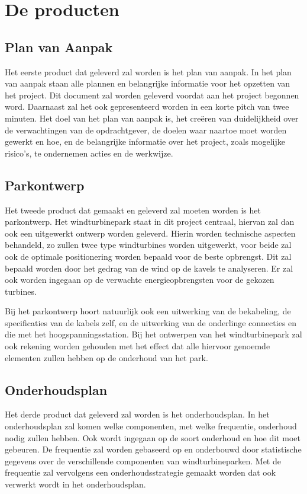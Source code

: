 \section{De producten}
\subsection{Plan van Aanpak}
Het eerste product dat geleverd zal worden is het plan van aanpak. In het plan van aanpak staan alle plannen en belangrijke informatie voor het opzetten van het project. Dit document zal worden geleverd voordat aan het project begonnen word. Daarnaast zal het ook gepresenteerd worden in een korte pitch van twee minuten. Het doel van het plan van aanpak is, het creëren van duidelijkheid over de verwachtingen van de opdrachtgever, de doelen waar naartoe moet worden gewerkt en hoe, en de belangrijke informatie over het project, zoals mogelijke risico's, te ondernemen acties en de werkwijze. 

\subsection{Parkontwerp}
Het tweede product dat gemaakt en geleverd zal moeten worden is het parkontwerp. Het windturbinepark staat in dit project centraal, hiervan zal dan ook een uitgewerkt ontwerp worden geleverd. Hierin worden technische aspecten behandeld, zo zullen twee type windturbines worden uitgewerkt, voor beide zal ook de optimale positionering worden bepaald voor de beste opbrengst. Dit zal bepaald worden door het gedrag van de wind op de kavels te analyseren. Er zal ook worden ingegaan op de verwachte energieopbrengsten voor de gekozen turbines. 

Bij het parkontwerp hoort natuurlijk ook een uitwerking van de bekabeling, de specificaties van de kabels zelf, en de uitwerking van de onderlinge connecties en die met het hoogspanningsstation. Bij het ontwerpen van het windturbinepark zal ook rekening worden gehouden met het effect dat alle hiervoor genoemde elementen zullen hebben op de onderhoud van het park. 

\subsection{Onderhoudsplan}
Het derde product dat geleverd zal worden is het onderhoudsplan. In het onderhoudsplan zal komen welke componenten, met welke frequentie, onderhoud nodig zullen hebben. Ook wordt ingegaan op de soort onderhoud en hoe dit moet gebeuren. De frequentie zal worden gebaseerd op en onderbouwd door statistische gegevens over de verschillende componenten van windturbineparken. Met de frequentie zal vervolgens een onderhoudsstrategie gemaakt worden dat ook verwerkt wordt in het onderhoudsplan. 

